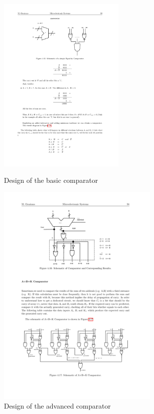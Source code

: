 \begin{figure}[H]
	\centering
	\begin{minipage}{.5\textwidth}
		\centering
		\includegraphics[width=0.55\textwidth]{chapters/4_DecodeStage/images/comparator_basic.pdf}
		\caption{Design of the basic comparator}
		\label{fig:comparator_basic}
	\end{minipage}%
	\begin{minipage}{.5\textwidth}
		\centering
		\includegraphics[width=0.7\textwidth]{chapters/4_DecodeStage/images/comparator_advanced.pdf}
		\caption{Design of the advanced comparator}
		\label{comparator_advanced}
	\end{minipage}
\end{figure}

